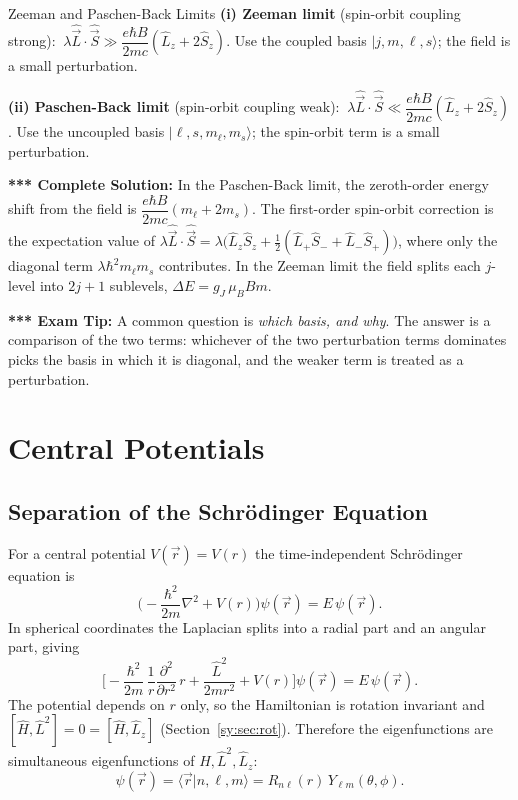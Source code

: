 \documentclass[11pt,a4paper]{article}
\begin{document}
\begin{thm}{Zeeman and Paschen-Back Limits}
\textbf{(i) Zeeman limit} (spin-orbit coupling strong): $\ \lambda\hat{\vec L}\cdot\hat{\vec S}\gg\dfrac{e\hbar B}{2mc}(\hat L_z+2\hat S_z)$. Use the coupled basis $|j,m,\ell,s\rangle$; the field is a small perturbation.

\textbf{(ii) Paschen-Back limit} (spin-orbit coupling weak): $\ \lambda\hat{\vec L}\cdot\hat{\vec S}\ll\dfrac{e\hbar B}{2mc}(\hat L_z+2\hat S_z)$. Use the uncoupled basis $|\ell,s,m_\ell,m_s\rangle$; the spin-orbit term is a small perturbation.
\end{thm}

\textbf{*** Complete Solution:} In the Paschen-Back limit, the zeroth-order energy shift from the field is $\dfrac{e\hbar B}{2mc}(m_\ell+2m_s)$. The first-order spin-orbit correction is the expectation value of $\lambda\hat{\vec L}\cdot\hat{\vec S}=\lambda\big(\hat L_z\hat S_z+\tfrac12(\hat L_+\hat S_-+\hat L_-\hat S_+)\big)$, where only the diagonal term $\lambda\hbar^2m_\ell m_s$ contributes. In the Zeeman limit the field splits each $j$-level into $2j+1$ sublevels, $\Delta E=g_J\,\mu_BBm$.

\textbf{*** Exam Tip:} A common question is \emph{which basis, and why}. The answer is a comparison of the two terms: whichever of the two perturbation terms dominates picks the basis in which it is diagonal, and the weaker term is treated as a perturbation.

\section{Central Potentials}
\label{sy:sec:central}

\subsection{Separation of the Schr\"odinger Equation}
For a central potential $V(\vec r)=V(r)$ the time-independent Schr\"odinger equation is
\[
\Big(-\frac{\hbar^2}{2m}\nabla^2+V(r)\Big)\psi(\vec r)=E\,\psi(\vec r).
\]
In spherical coordinates the Laplacian splits into a radial part and an angular part, giving
\[
\Big[-\frac{\hbar^2}{2m}\,\frac1r\frac{\partial^2}{\partial r^2}\,r+\frac{\hat L^2}{2mr^2}+V(r)\Big]\psi(\vec r)=E\,\psi(\vec r).
\]
The potential depends on $r$ only, so the Hamiltonian is rotation invariant and $[\hat H,\hat L^2]=0=[\hat H,\hat L_z]$ (Section~\ref{sy:sec:rot}). Therefore the eigenfunctions are simultaneous eigenfunctions of $\hat H,\hat L^2,\hat L_z$:
\[
\psi(\vec r)=\langle\vec r|n,\ell,m\rangle=R_{n\ell}(r)\,Y_{\ell m}(\theta,\phi).
\]
\end{document}
